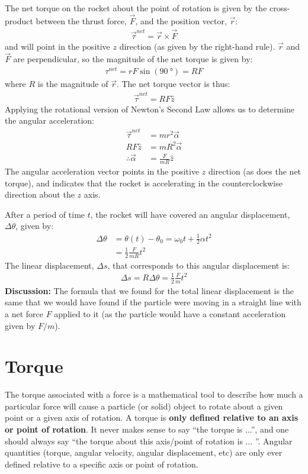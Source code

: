 \begin{example}
The net torque on the rocket about the point of rotation is given by the cross-product between the thrust force, $\vec F$, and the position vector, $\vec r$:
\begin{align*}
\vec\tau^{net} = \vec r\times\vec F
\end{align*}
and will point in the positive $z$ direction (as given by the right-hand rule). $\vec r$ and $\vec F$ are perpendicular, so the magnitude of the net torque is given by:
\begin{align*}
\tau^{net} = rF \sin(\SI{90}{\degree}) = RF
\end{align*}
where $R$ is the magnitude of $\vec r$. The net torque vector is thus:
\begin{align*}
\vec\tau^{net} = RF \hat z
\end{align*}
Applying the rotational version of Newton's Second Law allows us to determine the angular acceleration:
\begin{align*}
\vec \tau ^{net} &= mr^2\vec\alpha\\
RF \hat z&= mR^2\vec\alpha\\
\therefore \vec \alpha &= \frac{F}{mR}\hat z
\end{align*}
The angular acceleration vector points in the positive $z$ direction (as does the net torque), and indicates that the rocket is accelerating in the counterclockwise direction about the $z$ axis. 

After a period of time $t$, the rocket will have covered an angular displacement, $\Delta \theta$, given by:
\begin{align*}
\Delta \theta &= \theta(t)-\theta_0 = \omega_0t + \frac{1}{2}\alpha t^2\\
&=\frac{1}{2}\frac{F}{mR} t^2
\end{align*}
The linear displacement, $\Delta s$, that corresponds to this angular displacement is:
\begin{align*}
\Delta s = R \Delta\theta = \frac{1}{2}\frac{F}{m} t^2
\end{align*}
\textbf{Discussion:} The formula that we found for the total linear displacement is the same that we would have found if the particle were moving in a straight line with a net force $F$ applied to it (as the particle would have a constant acceleration given by $F/m$).
\end{example}


\section{Torque}
\label{sec:rotationaldynamics:torque}
The torque associated with a force is a mathematical tool to describe how much a particular force will cause a particle (or solid) object to rotate about a given point or a given axis of rotation. A torque is \textbf{only defined relative to an axis or point of rotation}. It never makes sense to say ``the torque is ...'', and one should always say ``the torque about this axis/point of rotation is ... ''. Angular quantities (torque, angular velocity, angular displacement, etc) are only ever defined relative to a specific axis or point of rotation.

